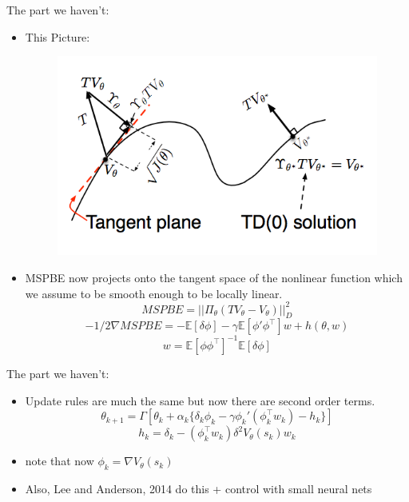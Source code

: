 \documentclass{beamer}
\begin{document}
\begin{frame}{The part we haven't:}

\begin{itemize}
\item This Picture:
  \begin{figure}
  \includegraphics[width=0.7\linewidth]{woah.png}
  \end{figure}
\item MSPBE now projects onto the tangent space of the nonlinear function which we assume to be smooth enough to be locally linear.\[MSPBE = || \Pi_\theta (TV_\theta - V_\theta)||_D^2\]
 \[-1/2 \nabla MSPBE = - \mathbb{E}[\delta\phi]
- \gamma\mathbb{E}[\phi'\phi^\top]w + h(\theta, w)
  \]
\[w = \mathbb{E}[\phi\phi^\top]^{-1}\mathbb{E}[\delta\phi]\]
\end{itemize}

\end{frame}
\begin{frame}{The part we haven't:}

\begin{itemize}
\item Update rules are much the same but now there are second order terms.
\[\theta_{k+1} = \Gamma\left[\theta_k + \alpha_k\{\delta_k\phi_k - \gamma\phi_k'(\phi_k^\top w_k) - h_k\}\right]\]
\[h_k = \delta_k - (\phi_k^\top w_k) \delta^2V_\theta(s_k)w_k\]
\item note that now $\phi_k = \nabla V_\theta(s_k)$
\item Also, Lee and Anderson, 2014 do this + control with small neural nets
\end{itemize}
\end{frame}
\end{document}
